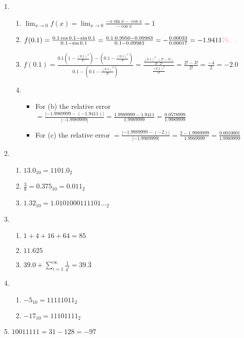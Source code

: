 \documentclass{article}
\begin{document}
\begin{enumerate}
{        }
        \item {
            \begin{enumerate}
                \item \(\lim_{x\to0}f(x) = \lim_{x\to0}\frac{-x\sin x - \cos x}{-\cos x} = 1\)
                \item \(f(0.1) = \frac{0.1\cos0.1-\sin0.1}{0.1-\sin0.1} = \frac{0.1\cdot0.9950-0.09983}{0.1-0.09983} = -\frac{0.00033}{0.00017} = -1.9411{\color{lightgray}76\dots}\)
                \item \(f(0.1) = \frac{0.1(1-\frac{(0.1)^2}{2!})-(0.1-\frac{(0.1)^3}{3!})}{0.1-(0.1-\frac{(0.1)^3}{3!})} = \frac{\frac{(0.1)^3\cdot(2!-3!)}{3!\cdot2!}}{\frac{(0.1)^3}{3!}} = \frac{2!-3!}{2!} = \frac{-4}{2} = -2.0\)
                \item \begin{itemize}
                    \item For (b) the relative error \(= \frac{|-1.9989999 - (-1.9411)|}{|-1.9989999|} = \frac{1.9989999-1.9411}{1.9989999} = \frac{0.0578999}{1.9989999}\)
                    \item For (c) the relative error \(= \frac{|-1.9989999 - (-2)|}{|-1.9989999|} = \frac{2 - 1.9989999}{1.9989999} = \frac{0.0010001}{1.9989999}\)
                \end{itemize}
            \end{enumerate}
        }
        \item {
            \begin{enumerate}
                \item \(13.0_{10} = 1101.0_2\)
                \item \(\frac{3}{8} = 0.375_{10} = 0.011_{2}\)
                \item \(1.32_{10} = 1.0101000111101\dots_2\)
            \end{enumerate}
        }
        \item {
            \begin{enumerate}
                \item \(1+4+16+64 = 85\)
                \item \(11.625\)
                \item \(39.0 + \sum_{i=1}^{\infty} \frac{1}{4^i} = 39.\overline{3}\)
            \end{enumerate}
        }
        \item {
            \begin{enumerate}
                \item \(-5_{10} = 11111011_2\)
                \item \(-17_{10} = 11101111_2\)
            \end{enumerate}
        }
        \item {
            \(10011111 = 31 - 128 = -97\)
        }
    \end{enumerate}
\end{document}
